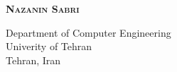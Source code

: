 \documentclass {article}
\begin{document}
	\begin{titlepage} 
		\begin{center}
			\textsc{\bfseries Nazanin Sabri}\\
		\end{center}
		\begin{flushleft}
			Department of Computer Engineering\\
			Univerity of Tehran\\
			Tehran, Iran\\
		\end{flushleft}
	\end{titlepage}
\end{document}
